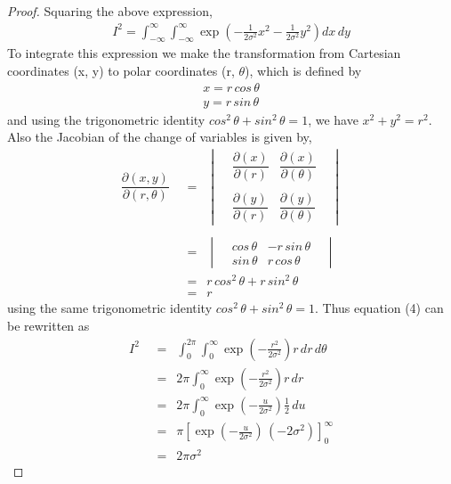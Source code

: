 \documentclass[14pt]{extarticle}
\begin{document}
\begin{flushleft}
\begin{proof}
Squaring the above expression,
\begin{align}
I^2 = \int_{-\infty}^{\infty}\int_{-\infty}^{\infty} \exp\left(-\frac{1}{2\sigma^2}x^2-\frac{1}{2\sigma^2}y^2\right)dx\,dy
\end{align}
To integrate this expression we make the transformation from Cartesian coordinates (x, y) to polar coordinates (r, $\theta$), which is defined by
\begin{align}
x = r \, cos\,\theta\\
y = r \, sin\, \theta
\end{align}
and using the trigonometric identity $cos^2\,\theta + sin^2\, \theta = 1$, we have $x^2 + y^2 = r^2$. Also the Jacobian of the change of variables is given by,
\begin{align*}
\dfrac{\partial \left(x, y\right)}{\partial \left(r, \theta\right)} \,\,&= \,\,\,\begin{vmatrix}
&\dfrac{\partial \left(x \right)}{\partial \left(r \right)} &\dfrac{\partial \left(x \right)}{\partial \left(\theta \right)}&\\
\\
&\dfrac{\partial \left(y \right)}{\partial \left(r \right)} &\dfrac{\partial \left(y \right)}{\partial \left(\theta \right)}&
\end{vmatrix}\\
\\
&= \,\,\,
\begin{vmatrix}
&cos \,\theta &-r\,sin \, \theta&
\\
&sin \,\theta &r\,cos\,\theta&
\end{vmatrix}\\
&=\,\,\, r\, cos^2\,\theta + r\, sin^2\,\theta
\\
&=\,\,\, r
\end{align*}
using the same trigonometric identity $cos^2\,\theta + sin^2\, \theta = 1$.
Thus equation (4) can be rewritten as 
\begin{align}
I^2 \,\,&=\,\,\, \int_{0}^{2\pi}\int_{0}^{\infty} \exp\left(-\frac{r^2}{2\sigma^2}\right) r\,dr\,d\theta 
\\
&= \,\,\,2\pi\int_{0}^{\infty} \exp\left(-\frac{r^2}{2\sigma^2}\right) r\,dr
\\
&= \,\,\,2\pi\int_{0}^{\infty} \exp\left(-\frac{u}{2\sigma^2}\right) \frac{1}{2}\,du
\\
&=\,\,\,\pi\left[\exp\left(-\frac{u}{2\sigma^2}\right)\,\left(-2\sigma^2\right)\right]_0^\infty
\\
&=\,\,\,2\pi\sigma^2
\end{align}

\end{proof}
\end{flushleft}
\end{document}
